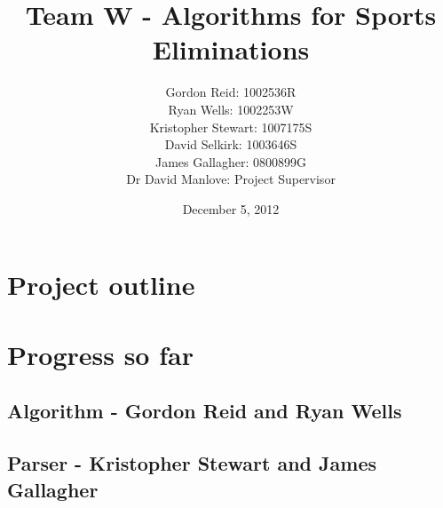 \documentclass{beamer}
\title{Team W - Algorithms for Sports Eliminations}
\author{
    Gordon Reid: 1002536R\\
    Ryan Wells: 1002253W\\
    Kristopher Stewart: 1007175S\\
    David Selkirk: 1003646S\\
    James Gallagher: 0800899G\\
    Dr David Manlove: Project Supervisor
}
\date{December 5, 2012}
\begin{document}
\frame{\titlepage}
\section[Outline]{}
\frame{\tableofcontents}
\section{Project outline}
\section{Progress so far}
\subsection{Algorithm - Gordon Reid and Ryan Wells}
\subsection{Parser - Kristopher Stewart and James Gallagher}
\end{document}
